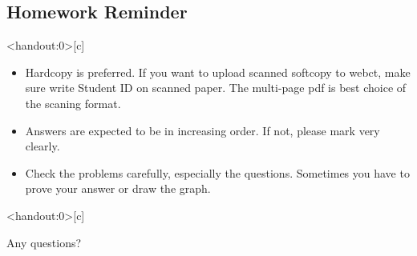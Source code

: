 \documentclass[
        handout,
        ]{beamer}
\begin{document}
        
        

    \subsection{Homework Reminder}
        \begin{frame}<handout:0>[c]{\subsecname}
            \begin{itemize}[<+-|alert@+>]
            	\item Hardcopy is preferred. If you want to upload scanned softcopy to webct, make sure write Student ID on scanned paper. The multi-page pdf is best choice of the scaning format.
            	\item Answers are expected to be in increasing order. If not, please mark very clearly.
            	\item Check the problems carefully, especially the questions. Sometimes you have to prove your answer or draw the graph.
            \end{itemize}
        \end{frame}
    
    \begin{frame}<handout:0>[c]{\secname}
        \centerline{\Large{Any questions?}}
    \end{frame}
    
    
    
\end{document}
